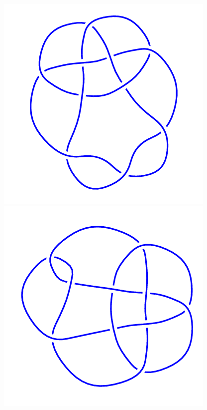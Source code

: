 \begin{figure}[H]
    \begin{minipage}[b]{.18\linewidth}
        \centering
        \includegraphics[width=\linewidth]{../data/10_112.png}
    \end{minipage}
    \begin{minipage}[b]{.18\linewidth}
        \centering
        \includegraphics[width=\linewidth]{../data/10_113.png}

\end{minipage}
\end{figure}
